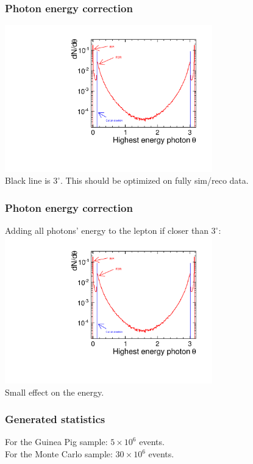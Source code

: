 \documentclass{beamer}
\begin{document}
\begin{frame}
\frametitle{Photon energy correction}
\includegraphics[width=9cm,page=5]{BHWideAnalysis.pdf}\\
Black line is $3^\circ$. This should be optimized on fully sim/reco data. 
\end{frame}
\begin{frame}
\frametitle{Photon energy correction}
Adding all photons' energy to the lepton if closer than $3^\circ$:\\
\includegraphics[width=9cm,page=6]{BHWideAnalysis.pdf}\\
Small effect on the energy.
\end{frame}
\begin{frame}
\frametitle{Generated statistics}
For the Guinea Pig sample: $5\times 10^6$ events.\\
For the Monte Carlo sample: $30\times 10^6$ events.
\end{frame}
\end{document}
